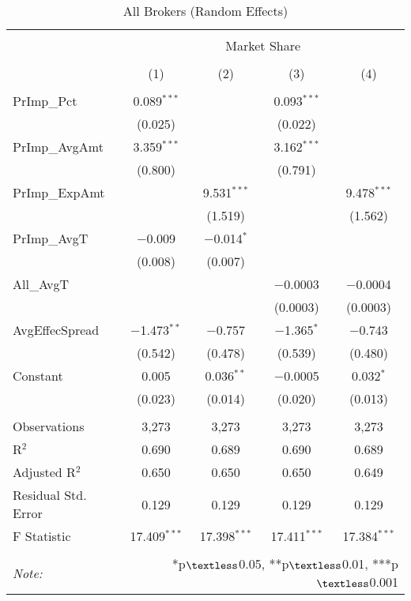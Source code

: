 \documentclass[12pt,a4paper]{article}
\begin{document}
		\begin{table}[!htbp] 
			\centering 
			\captionsetup{font=large}
			\caption{All Brokers (Random Effects)} 
			\label{} 
			\begin{tabular}{@{\extracolsep{1em}}lcccc} 
				\\[-1.8ex]\hline 
				\hline \\[-1.8ex] 
				& \multicolumn{4}{c}{Market Share} \\ 
				\cline{2-5} 
				\\[-1.8ex] & (1) & (2) & (3) & (4)\\ 
				\hline \\[-1.8ex] 
				PrImp\_Pct & 0.089$^{***}$ &  & 0.093$^{***}$ &  \\ 
				& (0.025) &  & (0.022) &  \\ 
				PrImp\_AvgAmt & 3.359$^{***}$ &  & 3.162$^{***}$ &  \\ 
				& (0.800) &  & (0.791) &  \\ 
				PrImp\_ExpAmt &  & 9.531$^{***}$ &  & 9.478$^{***}$ \\ 
				&  & (1.519) &  & (1.562) \\ 
				PrImp\_AvgT & $-$0.009 & $-$0.014$^{*}$ &  &  \\ 
				& (0.008) & (0.007) &  &  \\ 
				All\_AvgT &  &  & $-$0.0003 & $-$0.0004 \\ 
				&  &  & (0.0003) & (0.0003) \\ 
				AvgEffecSpread & $-$1.473$^{**}$ & $-$0.757 & $-$1.365$^{*}$ & $-$0.743 \\ 
				& (0.542) & (0.478) & (0.539) & (0.480) \\ 
				Constant & 0.005 & 0.036$^{**}$ & $-$0.0005 & 0.032$^{*}$ \\ 
				& (0.023) & (0.014) & (0.020) & (0.013) \\ 
				\hline \\[-1.8ex] 
				Observations & 3,273 & 3,273 & 3,273 & 3,273 \\ 
				R$^{2}$ & 0.690 & 0.689 & 0.690 & 0.689 \\ 
				Adjusted R$^{2}$ & 0.650 & 0.650 & 0.650 & 0.649 \\ 
				Residual Std. Error & 0.129 & 0.129  & 0.129 & 0.129  \\ 
				F Statistic & 17.409$^{***}$  & 17.398$^{***}$  & 17.411$^{***}$  & 17.384$^{***}$  \\ 
				\hline 
				\hline \\[-1.8ex] 
				\textit{Note:}  & \multicolumn{4}{r}{*p$\textless$0.05, **p$\textless$0.01, ***p$\textless$0.001} \\ 
			\end{tabular} 
		\end{table} 
	
\end{document}
